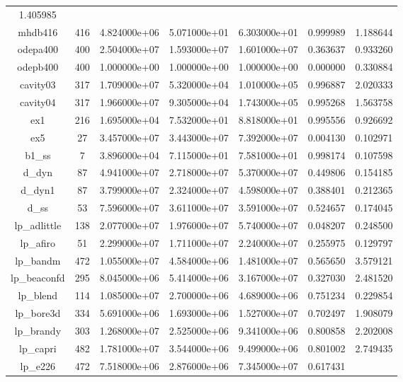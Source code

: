 \begin{table}[h]
\begin{tabular}{ccccccc}
    1.405985\\
    mhdb416 & 416 & 4.824000e+06 & 5.071000e+01 & 6.303000e+01 & 0.999989 &
    1.188644\\
    odepa400 & 400 & 2.504000e+07 & 1.593000e+07 & 1.601000e+07 & 0.363637 &
    0.933260\\
    odepb400 & 400 & 1.000000e+00 & 1.000000e+00 & 1.000000e+00 & 0.000000 &
    0.330884\\
    cavity03 & 317 & 1.709000e+07 & 5.320000e+04 & 1.010000e+05 & 0.996887 &
    2.020333\\
    cavity04 & 317 & 1.966000e+07 & 9.305000e+04 & 1.743000e+05 & 0.995268 &
    1.563758\\
    ex1 & 216 & 1.695000e+04 & 7.532000e+01 & 8.818000e+01 & 0.995556 &
    0.926692\\
    ex5 & 27 & 3.457000e+07 & 3.443000e+07 & 7.392000e+07 & 0.004130 &
    0.102971\\
    b1\_ss & 7 & 3.896000e+04 & 7.115000e+01 & 7.581000e+01 & 0.998174 &
    0.107598\\
    d\_dyn & 87 & 4.941000e+07 & 2.718000e+07 & 5.370000e+07 & 0.449806 &
    0.154185\\
    d\_dyn1 & 87 & 3.799000e+07 & 2.324000e+07 & 4.598000e+07 & 0.388401 &
    0.212365\\
    d\_ss & 53 & 7.596000e+07 & 3.611000e+07 & 3.591000e+07 & 0.524657 &
    0.174045\\
    lp\_adlittle & 138 & 2.077000e+07 & 1.976000e+07 & 5.740000e+07 & 0.048207
    & 0.248500\\
    lp\_afiro & 51 & 2.299000e+07 & 1.711000e+07 & 2.240000e+07 & 0.255975 &
    0.129797\\
    lp\_bandm & 472 & 1.055000e+07 & 4.584000e+06 & 1.481000e+07 & 0.565650 &
    3.579121\\
    lp\_beaconfd & 295 & 8.045000e+06 & 5.414000e+06 & 3.167000e+07 & 0.327030
    & 2.481520\\
    lp\_blend & 114 & 1.085000e+07 & 2.700000e+06 & 4.689000e+06 & 0.751234 &
    0.229854\\
    lp\_bore3d & 334 & 5.691000e+06 & 1.693000e+06 & 1.527000e+07 & 0.702497 &
    1.908079\\
    lp\_brandy & 303 & 1.268000e+07 & 2.525000e+06 & 9.341000e+06 & 0.800858 &
    2.202008\\
    lp\_capri & 482 & 1.781000e+07 & 3.544000e+06 & 9.499000e+06 & 0.801002 &
    2.749435\\
    lp\_e226 & 472 & 7.518000e+06 & 2.876000e+06 & 7.345000e+07 & 0.617431 &

\end{tabular}
\end{table}
